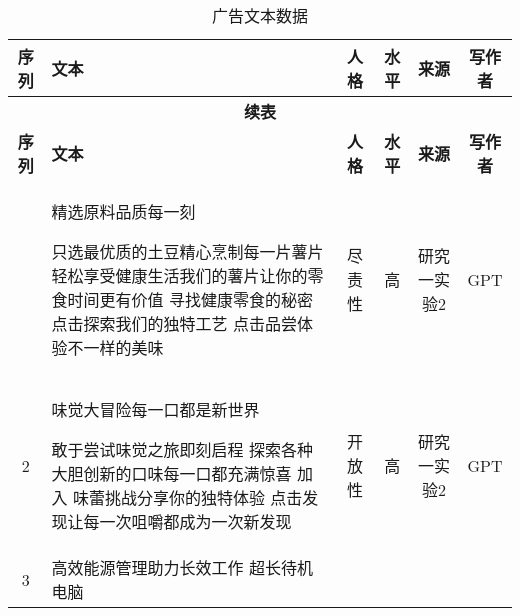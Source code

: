 {\longtablesongti
\begin{longtable}{c p{8cm} c c c c}
    \caption{广告文本数据} \\ 
    \toprule
    \textbf{序列} & \textbf{文本} & \textbf{人格} & \textbf{水平} & \textbf{来源} & \textbf{写作者} \\
    \midrule
    \endfirsthead

    \multicolumn{6}{c}{\textbf{续表}} \\
    \toprule
    \textbf{序列} & \textbf{文本} & \textbf{人格} & \textbf{水平} & \textbf{来源} & \textbf{写作者} \\
    \midrule
    \endhead

    \bottomrule
    \endfoot
        1 & 精选原料品质每一刻

         只选最优质的土豆精心烹制每一片薯片
         轻松享受健康生活我们的薯片让你的零食时间更有价值
         寻找健康零食的秘密点击探索我们的独特工艺
         点击品尝体验不一样的美味 & 尽责性 & 高 & 研究一实验2 & GPT \\
        2 & 味觉大冒险每一口都是新世界

 敢于尝试味觉之旅即刻启程
 探索各种大胆创新的口味每一口都充满惊喜
 加入 味蕾挑战分享你的独特体验
 点击发现让每一次咀嚼都成为一次新发现 & 开放性 & 高 & 研究一实验2 & GPT \\
        3 & 高效能源管理助力长效工作  超长待机电脑


\end{longtable}}
